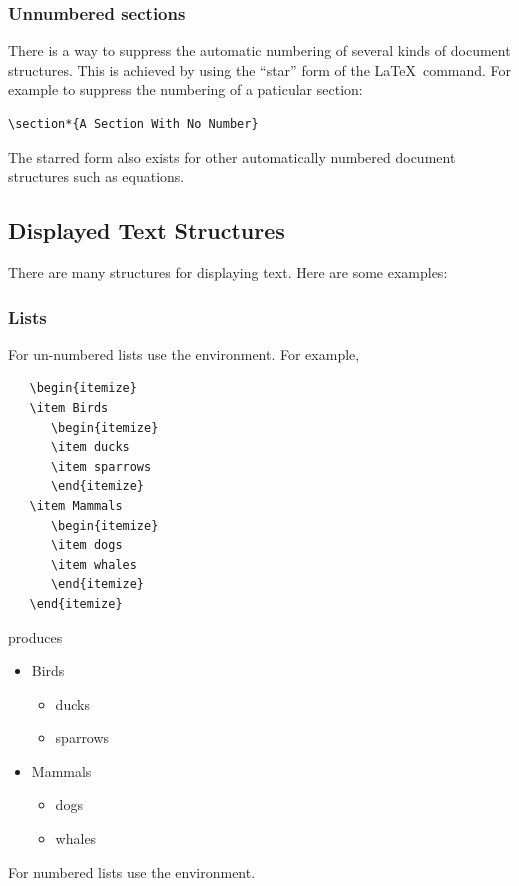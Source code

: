 \subsubsection{Unnumbered sections}
There is a way to suppress the automatic numbering of several kinds of document
structures. This is achieved by using the ``star'' form of the \LaTeX\ command.
For example to suppress the numbering of a paticular section:
\begin{verbatim}
\section*{A Section With No Number}
\end{verbatim}
The starred form also exists for other automatically numbered document structures such as equations. 
\subsection{Displayed Text Structures}
There are many structures for displaying text.
Here are some examples:
\subsubsection{Lists}
For un-numbered lists use the  environment.
For example,
\begin{verbatim}
   \begin{itemize}
   \item Birds
      \begin{itemize}
      \item ducks
      \item sparrows
      \end{itemize}
   \item Mammals
      \begin{itemize}
      \item dogs
      \item whales
      \end{itemize}
   \end{itemize}
\end{verbatim}
produces
   \begin{itemize}
   \item Birds
      \begin{itemize}
      \item ducks
      \item sparrows
      \end{itemize}
   \item Mammals
      \begin{itemize}
      \item dogs
      \item whales
      \end{itemize}
   \end{itemize}
For numbered lists use the  environment.

